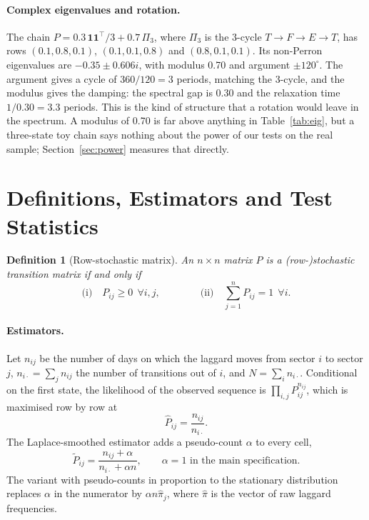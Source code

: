 \documentclass[11pt]{article}
\newtheorem{definition}{Definition}
\begin{document}
\paragraph{Complex eigenvalues and rotation.} The chain $P = 0.3\,\mathbf 1\mathbf 1^\top/3 + 0.7\,\Pi_3$, where $\Pi_3$ is the 3-cycle $T \to F \to E \to T$, has rows $(0.1, 0.8, 0.1)$, $(0.1, 0.1, 0.8)$ and $(0.8, 0.1, 0.1)$. Its non-Perron eigenvalues are $-0.35 \pm 0.606i$, with modulus 0.70 and argument $\pm 120^\circ$. The argument gives a cycle of $360/120 = 3$ periods, matching the 3-cycle, and the modulus gives the damping: the spectral gap is 0.30 and the relaxation time $1/0.30 = 3.3$ periods. This is the kind of structure that a rotation would leave in the spectrum. A modulus of 0.70 is far above anything in Table~\ref{tab:eig}, but a three-state toy chain says nothing about the power of our tests on the real sample; Section~\ref{sec:power} measures that directly.

\clearpage
\section{Definitions, Estimators and Test Statistics}
\label{app:defs}

\begin{definition}[Row-stochastic matrix]
\label{def:stoch}
An $n \times n$ matrix $P$ is a (row-)stochastic transition matrix if and only if
\begin{equation}
\text{(i)}\quad P_{ij} \ge 0 \ \ \forall i,j, \qquad\qquad \text{(ii)}\quad \sum_{j=1}^n P_{ij} = 1 \ \ \forall i.
\end{equation}
\end{definition}

\paragraph{Estimators.} Let $n_{ij}$ be the number of days on which the laggard moves from sector $i$ to sector $j$, $n_{i\cdot} = \sum_j n_{ij}$ the number of transitions out of $i$, and $N = \sum_i n_{i\cdot}$. Conditional on the first state, the likelihood of the observed sequence is $\prod_{i,j} P_{ij}^{n_{ij}}$, which is maximised row by row at
\begin{equation}
\hat P_{ij} = \frac{n_{ij}}{n_{i\cdot}}.
\end{equation}
The Laplace-smoothed estimator adds a pseudo-count $\alpha$ to every cell,
\begin{equation}
\tilde P_{ij} = \frac{n_{ij} + \alpha}{n_{i\cdot} + \alpha n}, \qquad \alpha = 1 \text{ in the main specification.}
\end{equation}
The variant with pseudo-counts in proportion to the stationary distribution replaces $\alpha$ in the numerator by $\alpha n \hat\pi_j$, where $\hat\pi$ is the vector of raw laggard frequencies.
\end{document}

